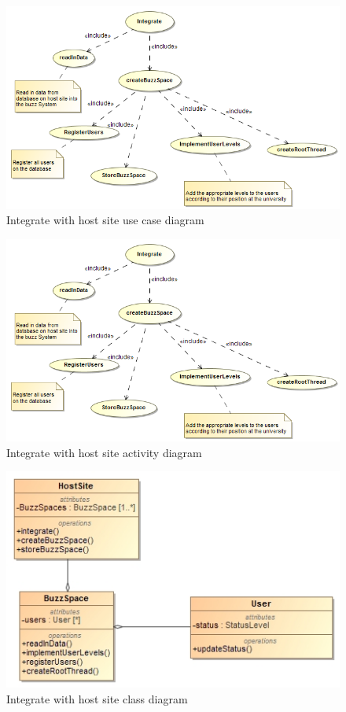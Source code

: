 \documentclass[11pt]{article}
\begin{document}
\begin{enumerate}
\graphicspath{ {../Diagrams/Maret/usecase/} }	
	\begin{figure}[H]	
    	\includegraphics[scale=0.5]{Integrate.png}
    	\caption{Integrate with host site use case diagram}
	\end{figure}
	
\graphicspath{ {../Diagrams/Maret/activity/} }
	\begin{figure}[H]	
    	\includegraphics[scale=0.5]{Integrate.png}
    	\caption{Integrate with host site activity diagram}
	\end{figure}
\graphicspath{ {../Diagrams/Maret/class/} }
	\begin{figure}[H]	
    	\includegraphics[scale=0.5]{Integrate.jpg}
    	\caption{Integrate with host site class diagram}
	\end{figure}
	

\end{enumerate}
\end{document}

